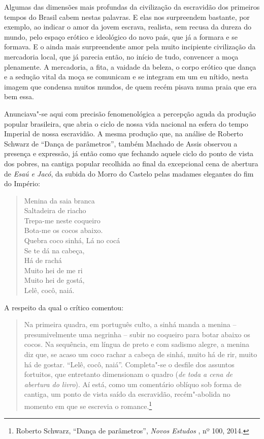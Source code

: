 Algumas das dimensões mais profundas da civilização da escravidão dos
primeiros tempos do Brasil cabem nestas palavras. E elas nos surpreendem
bastante, por exemplo, ao indicar o amor da jovem escrava, realista, sem
recusa da dureza do mundo, pelo espaço erótico e ideológico do novo
país, que já a formara e se formava. E o ainda mais surpreendente amor
pela muito incipiente civilização da mercadoria local, que já parecia
então, no início de tudo, convencer a moça plenamente. A mercadoria, a
fita, a vaidade da beleza, o corpo erótico que dança e a sedução vital
da moça se comunicam e se integram em um eu nítido, nesta imagem que
condensa muitos mundos, de quem recém pisava numa praia que era bem
essa.

Anunciava"-se aqui com precisão fenomenológica a percepção aguda da
produção popular brasileira, que abria o ciclo de nossa vida nacional na
esfera do tempo Imperial de nossa escravidão. A mesma produção que, na
análise de Roberto Schwarz de ``Dança de parâmetros'', também Machado de
Assis observou a presença e expressão, já então como que fechando aquele
ciclo do ponto de vista dos pobres, na cantiga popular recolhida ao
final da excepcional cena de abertura de \emph{Esaú e Jacó}, da subida
do Morro do Castelo pelas madames elegantes do fim do Império:

\begin{verse}
Menina da saia branca\\
Saltadeira de riacho\\
Trepa-me neste coqueiro\\
Bota-me os cocos abaixo.\\[5pt]
Quebra coco sinhá, Lá no cocá\\
Se te dá na cabeça,\\
Há de rachá\\[5pt]
Muito hei de me ri\\
Muito hei de gostá,\\
Lelê, cocô, naiá.
\end{verse}

A respeito da qual o crítico comentou: 

\begin{quote}
Na primeira quadra, em português culto, a sinhá manda a menina -- presumivelmente uma negrinha -- subir no coqueiro para botar abaixo os cocos. Na sequência, em
língua de preto e com sadismo alegre, a menina diz que, se acaso um coco
rachar a cabeça de sinhá, muito há de rir, muito há de gostar. ``Lelê,
cocô, naiá''. Completa"-se o desfile dos assuntos fortuitos, que
entretanto dimensionam o quadro (\emph{de toda a cena de abertura do
livro}). Aí está, como um comentário oblíquo sob forma de cantiga, um
ponto de vista saído da escravidão, recém"-abolida no momento em que se
escrevia o romance.\footnote{Roberto Schwarz, ``Dança de parâmetros'',
  \emph{Novos Estudos }, nº 100, 2014.}
\end{quote}


